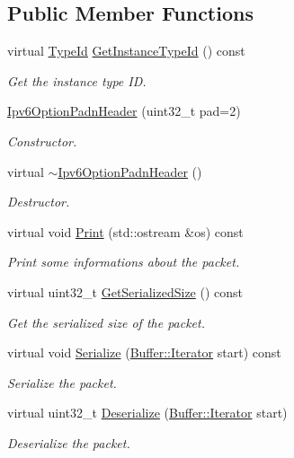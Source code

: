 \subsection*{Public Member Functions}
\begin{DoxyCompactItemize}
\item 
virtual \hyperlink{classns3_1_1TypeId}{Type\+Id} \hyperlink{classns3_1_1Ipv6OptionPadnHeader_a9fe08e6f1dcc0890dff484a459918149}{Get\+Instance\+Type\+Id} () const 
\begin{DoxyCompactList}\small\item\em Get the instance type ID. \end{DoxyCompactList}\item 
\hyperlink{classns3_1_1Ipv6OptionPadnHeader_a88ed4885e22c99c8073bd3cdc0054242}{Ipv6\+Option\+Padn\+Header} (uint32\+\_\+t pad=2)
\begin{DoxyCompactList}\small\item\em Constructor. \end{DoxyCompactList}\item 
virtual \hyperlink{classns3_1_1Ipv6OptionPadnHeader_ad5b01581b8826e2342f6f0382ace4794}{$\sim$\+Ipv6\+Option\+Padn\+Header} ()
\begin{DoxyCompactList}\small\item\em Destructor. \end{DoxyCompactList}\item 
virtual void \hyperlink{classns3_1_1Ipv6OptionPadnHeader_a94d50d81d33ff4c49ad77c641e957188}{Print} (std\+::ostream \&os) const 
\begin{DoxyCompactList}\small\item\em Print some informations about the packet. \end{DoxyCompactList}\item 
virtual uint32\+\_\+t \hyperlink{classns3_1_1Ipv6OptionPadnHeader_abb5ccd11a307c2eb00414730c317b8ad}{Get\+Serialized\+Size} () const 
\begin{DoxyCompactList}\small\item\em Get the serialized size of the packet. \end{DoxyCompactList}\item 
virtual void \hyperlink{classns3_1_1Ipv6OptionPadnHeader_a806d49ab36d9f699ced66991efee1d00}{Serialize} (\hyperlink{classns3_1_1Buffer_1_1Iterator}{Buffer\+::\+Iterator} start) const 
\begin{DoxyCompactList}\small\item\em Serialize the packet. \end{DoxyCompactList}\item 
virtual uint32\+\_\+t \hyperlink{classns3_1_1Ipv6OptionPadnHeader_a11d0524b7407f22ab7dc2e618c7f810a}{Deserialize} (\hyperlink{classns3_1_1Buffer_1_1Iterator}{Buffer\+::\+Iterator} start)
\begin{DoxyCompactList}\small\item\em Deserialize the packet. \end{DoxyCompactList}\end{DoxyCompactItemize}
